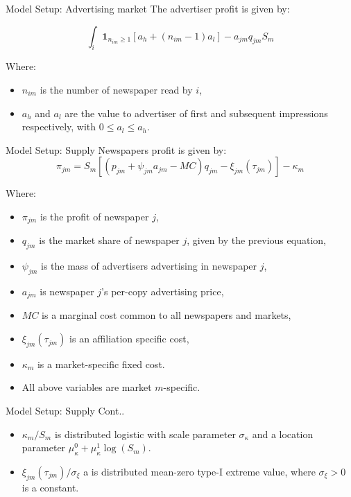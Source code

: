 \documentclass{beamer}
\begin{document}
\begin{frame}[t]{Model Setup: Advertising market}
  The advertiser profit is given by:

  \[ \int_i \textbf{1}_{n_{im} \geq 1}[a_h + (n_{im} - 1)a_l] -
    a_{jm}q_{jm}S_m \]

  Where:
  \begin{itemize}
    \item $n_{im}$ is the number of newspaper read by $i$,
    \item $a_h$ and $a_l$ are the value to advertiser of first and subsequent
      impressions respectively, with $0 \leq a_l \leq a_h$.
  \end{itemize}

\end{frame}

\begin{frame}[t]{Model Setup: Supply}
  Newspapers profit is given by:
  \[ \pi_{jm} = S_m[(p_{jm} + \psi_{jm}a_{jm} - MC)q_{jm} -
    \xi_{jm}(\tau_{jm})] - \kappa_m \]

  Where:
  \begin{itemize}
    \item $\pi_{jm}$ is the profit of newspaper $j$,
    \item $q_{jm}$ is the market share of newspaper $j$, given
      by the previous equation,
    \item $\psi_{jm}$ is the mass of advertisers advertising in newspaper $j$,
    \item $a_{jm}$ is newspaper $j$'s per-copy advertising price,
    \item $MC$ is a marginal cost common to all newspapers and markets,
    \item $\xi_{jm}(\tau_{jm})$ is an affiliation specific cost,
    \item $\kappa_m$ is a market-specific fixed cost.
    \item All above variables are market $m$-specific.
  \end{itemize}
\end{frame}

\begin{frame}[t]{Model Setup: Supply Cont..}
  \begin{itemize}
    \item $\kappa_m/S_m$ is distributed logistic with scale parameter
      $\sigma_\kappa$ and a location parameter
      $\mu_\kappa^0 + \mu_\kappa^1\log(S_m)$.
    \item $\xi_{jm}(\tau_{jm})/\sigma_\xi$ a is distributed mean-zero
      type-I extreme value, where $\sigma_\xi > 0$ is a constant.
  \end{itemize}
\end{frame}
\end{document}

